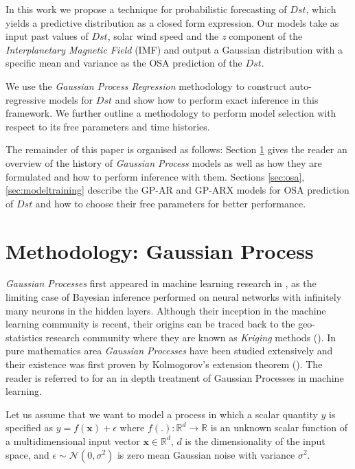 \documentclass[sw, draft]{AGUTeX}
\begin{document}
\begin{article}
In this work we propose a technique for probabilistic forecasting of $Dst$, which yields a predictive distribution as a closed form expression. Our models take as input past values of $Dst$, solar wind speed and the \textit{z} component of the \emph{Interplanetary Magnetic Field} (IMF) and output a Gaussian distribution with a specific mean and variance as the OSA prediction of the $Dst$. 

We use the \emph{Gaussian Process Regression} methodology to construct auto-regressive models for $Dst$ and show how to perform exact inference in this framework. We further outline a methodology to perform model selection with respect to its free parameters and time histories.

The remainder of this paper is organised as follows: Section \ref{sec:method} gives the reader an overview of the history of \emph{Gaussian Process} models as well as how they are formulated and how to perform inference with them. Sections \ref{sec:osa}, \ref{sec:modeltraining} describe the GP-AR and GP-ARX models for OSA prediction of $Dst$ and how to choose their free parameters for better performance. 

\section{Methodology: Gaussian Process} \label{sec:method}

\emph{Gaussian Processes} first appeared in machine learning research in \citet{Neal:1996:BLN:525544}, as the limiting case of Bayesian inference performed on neural networks with infinitely many neurons in the hidden layers. Although their inception in the machine learning community is recent, their origins can be traced back to the geo-statistics research community where they are known as \emph{Kriging} methods (\citet{krige1951statistical}). In pure mathematics area \emph{Gaussian Processes} have been studied extensively and their existence was first proven by Kolmogorov's extension theorem (\citet{tao2011introduction}). The reader is referred to \citet{Rasmussen:2005:GPM:1162254} for an in depth treatment of Gaussian Processes in machine learning.

Let us assume that we want to model a process in which a scalar quantity $y$ is specified as $y = f(\mathbf{x}) + \epsilon$ where   $f(.): \mathbb{R}^d \rightarrow \mathbb{R}$ is an unknown scalar function of a multidimensional input vector $\mathbf{x} \in \mathbb{R}^d$, $d$ is the dimensionality of the input space, and $\epsilon \sim \mathcal{N}(0, \sigma^2)$ is zero mean Gaussian noise with variance $\sigma^2$.


\end{article}
\end{document}
